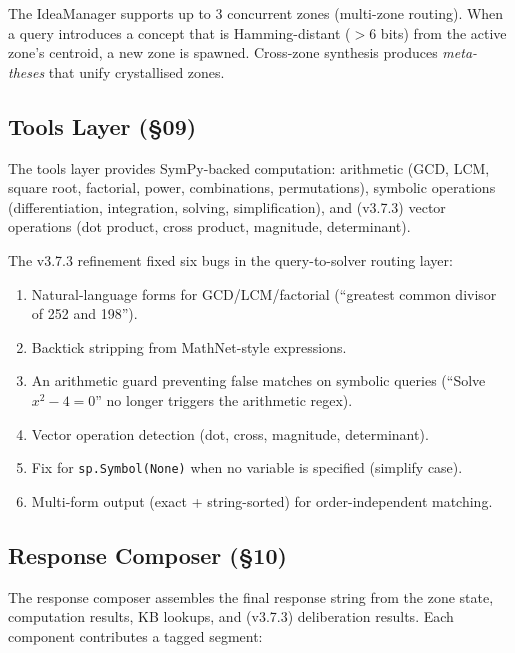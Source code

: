 \documentclass[11pt,a4paper]{article}
\begin{document}
The IdeaManager supports up to 3 concurrent zones (multi-zone routing). When a query introduces a concept that is Hamming-distant ($> 6$ bits) from the active zone's centroid, a new zone is spawned. Cross-zone synthesis produces \emph{meta-theses} that unify crystallised zones.

\subsection{Tools Layer (\S09)}

The tools layer provides SymPy-backed computation: arithmetic (GCD, LCM, square root, factorial, power, combinations, permutations), symbolic operations (differentiation, integration, solving, simplification), and (v3.7.3) vector operations (dot product, cross product, magnitude, determinant).

The v3.7.3 refinement fixed six bugs in the query-to-solver routing layer:
\begin{enumerate}
    \item Natural-language forms for GCD/LCM/factorial (``greatest common divisor of 252 and 198'').
    \item Backtick stripping from MathNet-style expressions.
    \item An arithmetic guard preventing false matches on symbolic queries (``Solve $x^2 - 4 = 0$'' no longer triggers the arithmetic regex).
    \item Vector operation detection (dot, cross, magnitude, determinant).
    \item Fix for \texttt{sp.Symbol(None)} when no variable is specified (simplify case).
    \item Multi-form output (exact + string-sorted) for order-independent matching.
\end{enumerate}

\subsection{Response Composer (\S10)}

The response composer assembles the final response string from the zone state, computation results, KB lookups, and (v3.7.3) deliberation results. Each component contributes a tagged segment:
\end{document}
